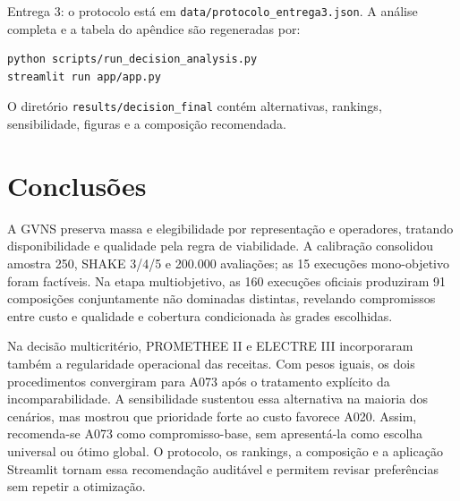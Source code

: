\documentclass[10pt,twocolumn,a4paper]{article}
\begin{document}
Entrega 3: o protocolo está em \texttt{data/protocolo\_entrega3.json}. A análise completa e a tabela do apêndice são regeneradas por:
\begin{minipage}{\columnwidth}
\begin{lstlisting}[language=bash]
python scripts/run_decision_analysis.py
streamlit run app/app.py
\end{lstlisting}
\end{minipage}
O diretório \texttt{results/decision\_final} contém alternativas, rankings, sensibilidade, figuras e a composição recomendada.

\section{Conclusões}

A GVNS preserva massa e elegibilidade por representação e operadores, tratando disponibilidade e qualidade pela regra de viabilidade. A calibração consolidou amostra 250, SHAKE 3/4/5 e 200.000 avaliações; as 15 execuções mono-objetivo foram factíveis. Na etapa multiobjetivo, as 160 execuções oficiais produziram 91 composições conjuntamente não dominadas distintas, revelando compromissos entre custo e qualidade e cobertura condicionada às grades escolhidas.

Na decisão multicritério, PROMETHEE II e ELECTRE III incorporaram também a regularidade operacional das receitas. Com pesos iguais, os dois procedimentos convergiram para A073 após o tratamento explícito da incomparabilidade. A sensibilidade sustentou essa alternativa na maioria dos cenários, mas mostrou que prioridade forte ao custo favorece A020. Assim, recomenda-se A073 como compromisso-base, sem apresentá-la como escolha universal ou ótimo global. O protocolo, os rankings, a composição e a aplicação Streamlit tornam essa recomendação auditável e permitem revisar preferências sem repetir a otimização.
\end{document}
